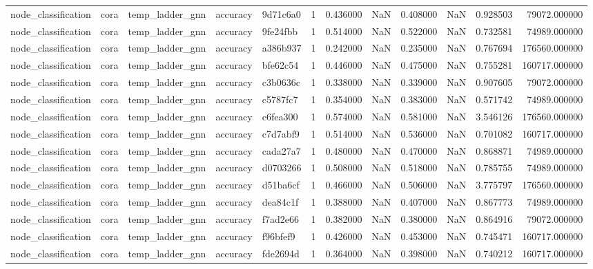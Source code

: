\begin{tabular}{lllllrrrrrrr}
node_classification & cora & temp_ladder_gnn & accuracy & 9d71c6a0 & 1 & 0.436000 & NaN & 0.408000 & NaN & 0.928503 & 79072.000000 \\
node_classification & cora & temp_ladder_gnn & accuracy & 9fe24fbb & 1 & 0.514000 & NaN & 0.522000 & NaN & 0.732581 & 74989.000000 \\
node_classification & cora & temp_ladder_gnn & accuracy & a386b937 & 1 & 0.242000 & NaN & 0.235000 & NaN & 0.767694 & 176560.000000 \\
node_classification & cora & temp_ladder_gnn & accuracy & bfe62c54 & 1 & 0.446000 & NaN & 0.475000 & NaN & 0.755281 & 160717.000000 \\
node_classification & cora & temp_ladder_gnn & accuracy & c3b0636c & 1 & 0.338000 & NaN & 0.339000 & NaN & 0.907605 & 79072.000000 \\
node_classification & cora & temp_ladder_gnn & accuracy & c5787fc7 & 1 & 0.354000 & NaN & 0.383000 & NaN & 0.571742 & 74989.000000 \\
node_classification & cora & temp_ladder_gnn & accuracy & c6fea300 & 1 & 0.574000 & NaN & 0.581000 & NaN & 3.546126 & 176560.000000 \\
node_classification & cora & temp_ladder_gnn & accuracy & c7d7abf9 & 1 & 0.514000 & NaN & 0.536000 & NaN & 0.701082 & 160717.000000 \\
node_classification & cora & temp_ladder_gnn & accuracy & cada27a7 & 1 & 0.480000 & NaN & 0.470000 & NaN & 0.868871 & 74989.000000 \\
node_classification & cora & temp_ladder_gnn & accuracy & d0703266 & 1 & 0.508000 & NaN & 0.518000 & NaN & 0.785755 & 74989.000000 \\
node_classification & cora & temp_ladder_gnn & accuracy & d51ba6cf & 1 & 0.466000 & NaN & 0.506000 & NaN & 3.775797 & 176560.000000 \\
node_classification & cora & temp_ladder_gnn & accuracy & dea84c1f & 1 & 0.388000 & NaN & 0.407000 & NaN & 0.867773 & 74989.000000 \\
node_classification & cora & temp_ladder_gnn & accuracy & f7ad2e66 & 1 & 0.382000 & NaN & 0.380000 & NaN & 0.864916 & 79072.000000 \\
node_classification & cora & temp_ladder_gnn & accuracy & f96bfef9 & 1 & 0.426000 & NaN & 0.453000 & NaN & 0.745471 & 160717.000000 \\
node_classification & cora & temp_ladder_gnn & accuracy & fde2694d & 1 & 0.364000 & NaN & 0.398000 & NaN & 0.740212 & 160717.000000 \\

\end{tabular}
